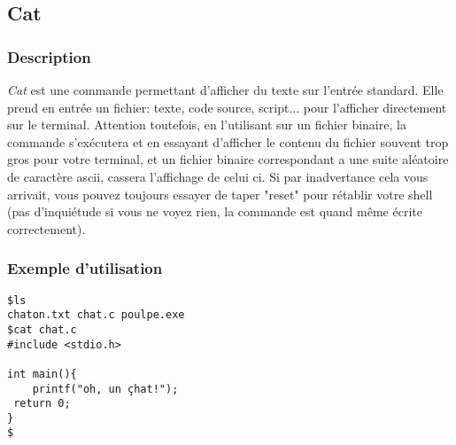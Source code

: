 \subsection{Cat}
\subsubsection{Description}
\emph{Cat} est une commande permettant d'afficher du texte sur l'entrée standard.
Elle prend en entrée un fichier: texte, code source, script... pour l'afficher directement sur le terminal.
Attention toutefois, en l'utilisant sur un fichier binaire, la commande s'exécutera et en essayant d'afficher le contenu du fichier souvent trop gros pour votre terminal, et un fichier binaire correspondant a une suite aléatoire de caractère ascii, cassera l'affichage de celui ci.
Si par inadvertance cela vous arrivait, vous pouvez toujours essayer de taper "reset" pour rétablir votre shell (pas d'inquiétude si vous ne voyez rien, la commande est quand même écrite correctement).

\subsubsection{Exemple d'utilisation}

\begin{lstlisting}
$ls
chaton.txt chat.c poulpe.exe
$cat chat.c
#include <stdio.h>

int main(){
	printf("oh, un çhat!");
 return 0;
}
$
\end{lstlisting}
